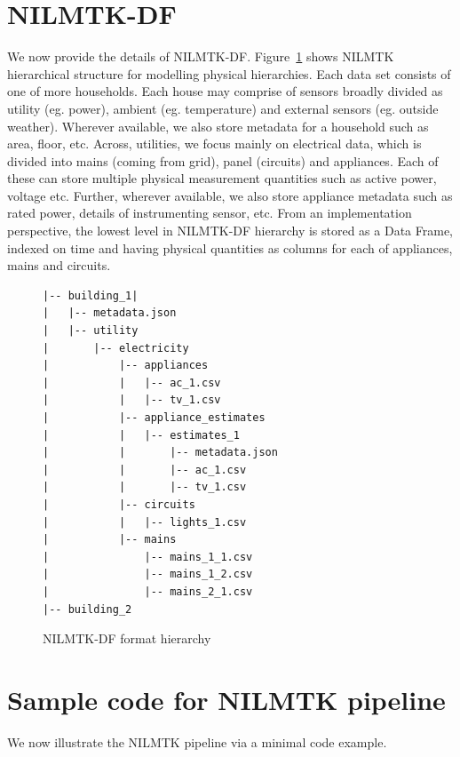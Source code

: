 \documentclass{sig-alternate}
\newcommand{\figref}[1]{Figure~\ref{#1}}
\begin{document}
\section{NILMTK-DF}
\label{app:appendix_data_format}
\noindent We now provide the details of NILMTK-DF. \figref{fig:nilmtk-format} shows NILMTK hierarchical structure for modelling physical hierarchies. Each data set consists of one of more households. Each house may comprise of sensors broadly divided as utility (eg. power), ambient (eg. temperature) and external sensors (eg. outside weather). Wherever available, we also store metadata for a household such as area, floor, etc.
Across, utilities, we focus mainly on electrical data, which is divided into mains (coming from grid), panel (circuits) and appliances. Each of these can store multiple physical measurement quantities such as 
active power, voltage etc. Further, wherever available, we also store appliance metadata such as rated power, details of instrumenting sensor, etc. From an implementation perspective, the lowest level in NILMTK-DF hierarchy is stored as a Data Frame, indexed on time and having physical quantities as columns for each of appliances, mains and circuits.
\begin{figure}
\begin{verbatim}
|-- building_1|
|   |-- metadata.json
|   |-- utility
|       |-- electricity
|           |-- appliances
|           |   |-- ac_1.csv
|           |   |-- tv_1.csv
|           |-- appliance_estimates
|           |   |-- estimates_1
|           |       |-- metadata.json
|           |       |-- ac_1.csv
|           |       |-- tv_1.csv
|           |-- circuits
|           |   |-- lights_1.csv
|           |-- mains
|               |-- mains_1_1.csv
|               |-- mains_1_2.csv
|               |-- mains_2_1.csv
|-- building_2
\end{verbatim}
\caption{NILMTK-DF format hierarchy}
\label{fig:nilmtk-format}
\end{figure}

\section{Sample code for NILMTK pipeline}
\label{app:appendix_pipeline}
\noindent We now illustrate the NILMTK pipeline via a minimal code example.
\end{document}
